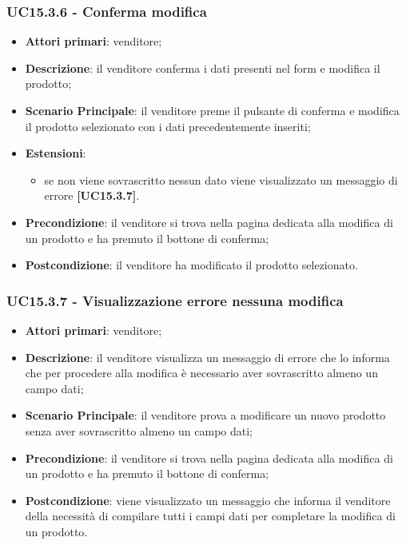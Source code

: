 \subsubsection{UC15.3.6 - Conferma modifica}
\begin{itemize}
\item \textbf{Attori primari}: venditore;
\item \textbf{Descrizione}: il venditore conferma i dati presenti nel form e modifica il prodotto;
\item \textbf{Scenario Principale}: il venditore preme il pulsante di conferma e modifica il prodotto selezionato con i dati precedentemente inseriti;
\item \textbf{Estensioni}: 
\begin{itemize}
	\item se non viene sovrascritto nessun dato viene visualizzato un messaggio di errore \textbf{[UC15.3.7]}.
\end{itemize} 
\item \textbf{Precondizione}: il venditore si trova nella pagina dedicata alla modifica di un prodotto e ha premuto il bottone di conferma;
\item \textbf{Postcondizione}: il venditore ha modificato il prodotto selezionato.
\end{itemize}

\subsubsection{UC15.3.7 - Visualizzazione errore nessuna modifica}
\begin{itemize}
\item \textbf{Attori primari}: venditore;
\item \textbf{Descrizione}: il venditore visualizza un messaggio di errore che lo informa che per procedere alla modifica è necessario aver sovrascritto almeno un campo dati;
\item \textbf{Scenario Principale}: il venditore prova a modificare un nuovo prodotto senza aver sovrascritto almeno un campo dati;
\item \textbf{Precondizione}: il venditore si trova nella pagina dedicata alla modifica di un prodotto e ha premuto il bottone di conferma;
\item \textbf{Postcondizione}: viene visualizzato un messaggio che informa il venditore della necessità di compilare tutti i campi dati per completare la modifica di un prodotto.
\end{itemize}

